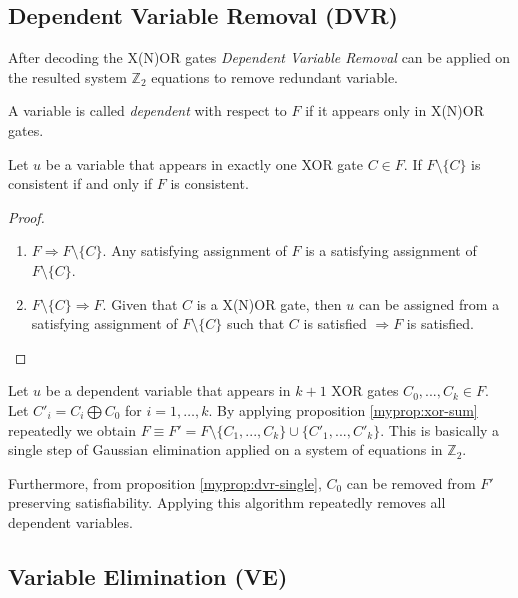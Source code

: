 \subsection{Dependent Variable Removal (DVR)}
\label{ssec:dvr}

After decoding the X(N)OR gates \emph{Dependent Variable
Removal} \cite{mine:march} can be applied on the resulted system
$\mathbb{Z}_2$ equations to remove redundant variable.

\begin{mydef}
  A variable is called \emph{dependent} with respect to $F$ if it
  appears only in X(N)OR gates.
\end{mydef}

\begin{myprop}[DVR]
  \label{myprop:dvr-single}
  Let $u$ be a variable that appears in exactly one XOR gate $C
  \in F$. If $F \setminus \{C\}$ is consistent if and only if $F$
  is consistent.
\end{myprop}

\begin{proof}
  \begin{enumerate}
    \item $F \Rightarrow F \setminus \{C\}$. Any satisfying
    assignment of $F$ is a satisfying assignment of $F \setminus
    \{C\}$. 
    \item $F \setminus \{C\} \Rightarrow F$.  Given that $C$ is a X(N)OR
    gate, then $u$ can be assigned from a satisfying assignment of
    $F \setminus \{C\}$ such that $C$ is satisfied $\Rightarrow F$
    is satisfied.
  \end{enumerate}
\end{proof}


Let $u$ be a dependent variable that appears in $k + 1$ XOR gates
$C_0, ..., C_k \in F$. Let $C'_i = C_i \bigoplus C_0$ for $i = 1,
\ldots, k$.  By applying proposition \ref{myprop:xor-sum} repeatedly we
obtain $F \equiv F' = F \setminus \{C_{1}, ..., C_k\} \cup \{C'_{1},
..., C'_k\}$. This is basically a single step of Gaussian
elimination applied on a system of equations in $\mathbb{Z}_2$.

Furthermore, from proposition \ref{myprop:dvr-single}, $C_0$ can be
removed from $F'$ preserving satisfiability. Applying this algorithm
repeatedly removes all dependent variables.


\subsection{Variable Elimination (VE)}
\label{ssec:ve}

